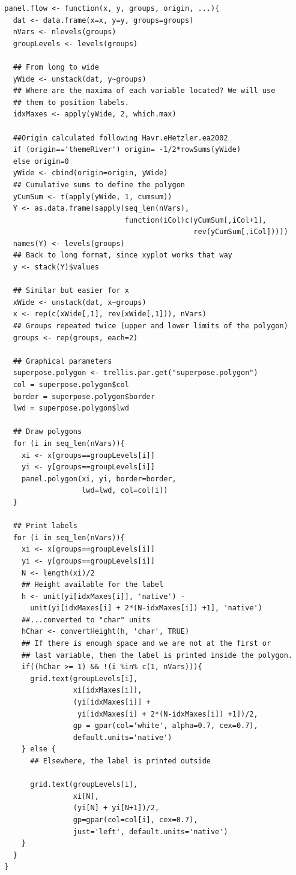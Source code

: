 \documentclass[smallroyalvopaper]{memoir}
\begin{document}
\lstset{language=r,label= ,caption= ,captionpos=b,numbers=none}
\begin{lstlisting}
  panel.flow <- function(x, y, groups, origin, ...){
    dat <- data.frame(x=x, y=y, groups=groups)
    nVars <- nlevels(groups)
    groupLevels <- levels(groups)
  
    ## From long to wide
    yWide <- unstack(dat, y~groups)
    ## Where are the maxima of each variable located? We will use
    ## them to position labels.
    idxMaxes <- apply(yWide, 2, which.max)
  
    ##Origin calculated following Havr.eHetzler.ea2002
    if (origin=='themeRiver') origin= -1/2*rowSums(yWide)
    else origin=0 
    yWide <- cbind(origin=origin, yWide)
    ## Cumulative sums to define the polygon
    yCumSum <- t(apply(yWide, 1, cumsum))
    Y <- as.data.frame(sapply(seq_len(nVars),
                              function(iCol)c(yCumSum[,iCol+1],
                                              rev(yCumSum[,iCol]))))
    names(Y) <- levels(groups)
    ## Back to long format, since xyplot works that way
    y <- stack(Y)$values
  
    ## Similar but easier for x
    xWide <- unstack(dat, x~groups)
    x <- rep(c(xWide[,1], rev(xWide[,1])), nVars)
    ## Groups repeated twice (upper and lower limits of the polygon)
    groups <- rep(groups, each=2)
    
    ## Graphical parameters
    superpose.polygon <- trellis.par.get("superpose.polygon")
    col = superpose.polygon$col
    border = superpose.polygon$border 
    lwd = superpose.polygon$lwd 
  
    ## Draw polygons
    for (i in seq_len(nVars)){
      xi <- x[groups==groupLevels[i]]
      yi <- y[groups==groupLevels[i]]
      panel.polygon(xi, yi, border=border,
                    lwd=lwd, col=col[i])
    }
  
    ## Print labels
    for (i in seq_len(nVars)){
      xi <- x[groups==groupLevels[i]]
      yi <- y[groups==groupLevels[i]]
      N <- length(xi)/2
      ## Height available for the label
      h <- unit(yi[idxMaxes[i]], 'native') -
        unit(yi[idxMaxes[i] + 2*(N-idxMaxes[i]) +1], 'native')
      ##...converted to "char" units
      hChar <- convertHeight(h, 'char', TRUE)
      ## If there is enough space and we are not at the first or
      ## last variable, then the label is printed inside the polygon.
      if((hChar >= 1) && !(i %in% c(1, nVars))){
        grid.text(groupLevels[i],
                  xi[idxMaxes[i]],
                  (yi[idxMaxes[i]] +
                   yi[idxMaxes[i] + 2*(N-idxMaxes[i]) +1])/2,
                  gp = gpar(col='white', alpha=0.7, cex=0.7),
                  default.units='native')
      } else {
        ## Elsewhere, the label is printed outside
  
        grid.text(groupLevels[i],
                  xi[N],
                  (yi[N] + yi[N+1])/2,
                  gp=gpar(col=col[i], cex=0.7),
                  just='left', default.units='native')
      }          
    }
  }
  
\end{lstlisting}
\end{document}
